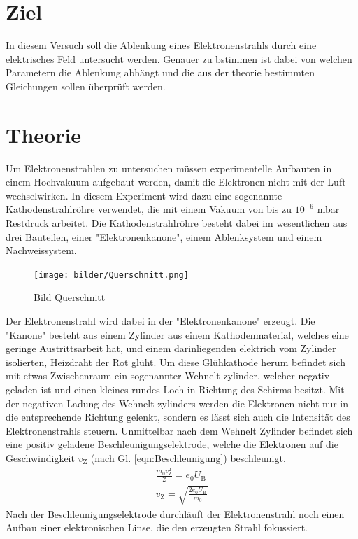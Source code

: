 \section{Ziel}
In diesem Versuch soll die Ablenkung eines Elektronenstrahls durch eine elektrisches Feld untersucht werden.
Genauer zu bstimmen ist dabei von welchen Parametern die Ablenkung abhängt und die aus der theorie bestimmten Gleichungen sollen überprüft werden.
\section{Theorie}
\label{sec:Theorie}
Um Elektronenstrahlen zu untersuchen müssen experimentelle Aufbauten in einem Hochvakuum aufgebaut werden, damit die Elektronen nicht mit der Luft wechselwirken.
In diesem Experiment wird dazu eine sogenannte Kathodenstrahlröhre verwendet, die mit einem Vakuum von bis zu $10^{-6}$ mbar Restdruck arbeitet.
Die Kathodenstrahlröhre besteht dabei im wesentlichen aus drei Bauteilen, einer "Elektronenkanone", einem Ablenksystem und einem Nachweissystem.
\begin{figure}[H]
    \centering
    \texttt{[image: bilder/Querschnitt.png]}
    \caption{Bild Querschnitt}
    \label{fig:Querschnitt}
\end{figure}
Der Elektronenstrahl wird dabei in der "Elektronenkanone" erzeugt. 
Die "Kanone" besteht aus einem Zylinder aus einem Kathodenmaterial, welches eine geringe Austrittsarbeit hat,
und einem darinliegenden elektrich vom Zylinder isolierten, Heizdraht der Rot glüht.
Um diese Glühkathode herum befindet sich mit etwas Zwischenraum ein sogenannter Wehnelt zylinder, welcher negativ geladen ist und einen kleines rundes Loch in Richtung des Schirms besitzt.
Mit der negativen Ladung des Wehnelt zylinders werden die Elektronen nicht nur in die entsprechende Richtung gelenkt, sondern es lässt sich auch die Intensität des Elektronenstrahls steuern.
Unmittelbar nach dem Wehnelt Zylinder befindet sich eine positiv geladene Beschleunigungselektrode, welche die Elektronen auf die Geschwindigkeit $v_{\text{Z}}$ (nach Gl. \ref{eqn:Beschleunigung}) beschleunigt.
\begin{align}
    \frac{ m_0 v_{\text{Z}}^2}{2}= e_0 U_{\text{B}} \nonumber \\
    v_{\text{Z}} = \sqrt{\frac{2 e_0 U_{\text{B}}}{m_0}} \label{eqn:Beschleunigung}
\end{align}
Nach der Beschleunigungselektrode durchläuft der Elektronenstrahl noch einen Aufbau einer elektronischen Linse, die den erzeugten Strahl fokussiert.
